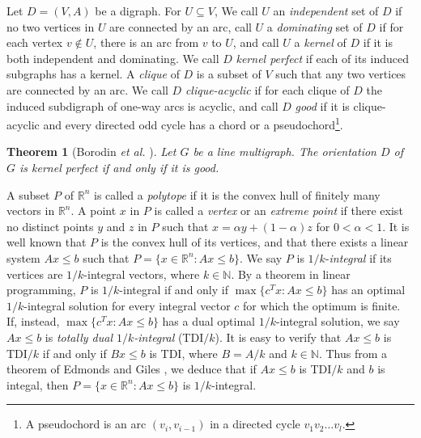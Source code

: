 \documentclass[11pt]{article}
\newtheorem{theorem}{Theorem}%
\numberwithin{theorem}{section}
\begin{document}
Let $D=(V,A)$ be a digraph. 
For $U\subseteq V$, We call $U$ an \textit{independent} set of $D$ if no two vertices in $U$ are connected by an arc, call $U$ a \textit{dominating} set of $D$ if for each vertex $v\not\in U$, there is an arc from $v$ to $U$, and call $U$ a \textit{kernel} of $D$ if it is both independent and dominating. 
We call $D$ \textit{kernel perfect} if each of its induced subgraphs has a kernel.
A \textit{clique} of $D$ is a subset of $V$ such that any two vertices are connected by an arc. We call $D$ \textit{clique-acyclic} if for each clique of $D$ the induced subdigraph of one-way arcs is acyclic, and call $D$ \textit{good} if it is clique-acyclic and every directed odd cycle has a chord or a pseudochord\footnote{A pseudochord is an arc $(v_i,v_{i-1})$ in a directed cycle $v_1 v_2\ldots v_l$.}. 

\begin{theorem}[Borodin \textit{et al.} \cite{BoroKost98}]
\label{thm:BoroKost98}
Let $G$ be a line multigraph. The orientation $D$ of $G$ is kernel perfect if and only if it is good.
\end{theorem}

A subset $P$ of $\mathbb{R}^n$ is called a \textit{polytope} if it is the convex hull of finitely many vectors in $\mathbb{R}^n$. A point $x$ in $P$ is called a \textit{vertex} or an \textit{extreme point} if there exist no distinct points $y$ and $z$ in $P$ such that $x=\alpha y+ (1-\alpha)z$ for $0<\alpha<1$. It is well known that $P$ is the convex hull of its vertices, and that there exists a linear system $Ax\leq b$ such that $P=\{x\in\mathbb{R}^n:Ax\leq b\}$. We say $P$ is $1/k$-\textit{integral} if its vertices are $1/k$-integral vectors, where $k\in\mathbb{N}$. By a theorem in linear programming, $P$ is $1/k$-integral if and only if $\max\{c^T x:Ax\leq b\}$ has an optimal $1/k$-integral solution for every integral vector $c$ for which the optimum is finite. If, instead, $\max\{c^T x:Ax\leq b\}$ has a dual optimal $1/k$-integral solution, we say $Ax\leq b$ is \textit{totally dual $1/k$-integral} (TDI$/k$).
It is easy to verify that $Ax\leq b$ is TDI$/k$ if and only if $Bx\leq b$ is TDI, where $B=A/k$ and $k\in\mathbb{N}$. Thus from a theorem of Edmonds and Giles \cite{EdmoGile77}, we deduce that if $Ax\leq b$ is TDI$/k$ and $b$ is integal, then $P=\{x\in\mathbb{R}^n:Ax\leq b\}$ is $1/k$-integral.
\end{document}
